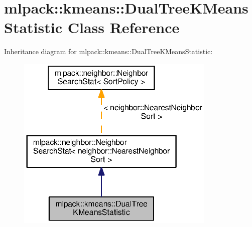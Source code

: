 \section{mlpack\+:\+:kmeans\+:\+:Dual\+Tree\+K\+Means\+Statistic Class Reference}
\label{classmlpack_1_1kmeans_1_1DualTreeKMeansStatistic}


Inheritance diagram for mlpack\+:\+:kmeans\+:\+:Dual\+Tree\+K\+Means\+Statistic\+:
\nopagebreak
\begin{figure}[H]
\begin{center}
\leavevmode
\includegraphics[width=269pt]{classmlpack_1_1kmeans_1_1DualTreeKMeansStatistic__inherit__graph}
\end{center}
\end{figure}
